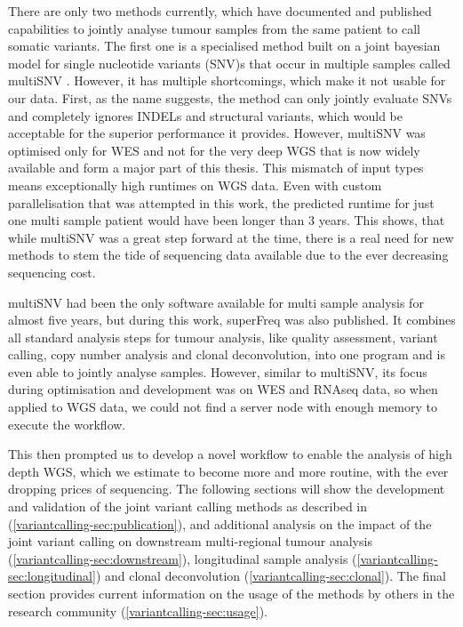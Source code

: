 There are only two methods currently, which have documented and published capabilities to jointly analyse tumour samples from the same patient to call somatic variants. The first one is a specialised method built on a joint bayesian model for single nucleotide variants (SNV)s that occur in multiple samples called multiSNV \cite{Josephidou2015}. However, it has multiple shortcomings, which make it not usable for our data. First, as the name suggests, the method can only jointly evaluate SNVs and completely ignores INDELs and structural variants, which would be acceptable for the superior performance it provides. However, multiSNV was optimised only for WES and not for the very deep WGS that is now widely available and form a major part of this thesis. This mismatch of input types means exceptionally high runtimes on WGS data. Even with custom parallelisation that was attempted in this work, the predicted runtime for just one multi sample patient would have been longer than 3 years. This shows, that while multiSNV was a great step forward at the time, there is a real need for new methods to stem the tide of sequencing data available due to the ever decreasing sequencing cost.

multiSNV had been the only software available for multi sample analysis for almost five years, but during this work, superFreq \cite{Flensburg2020} was also published. It combines all standard analysis steps for tumour analysis, like quality assessment, variant calling, copy number analysis and clonal deconvolution, into one program and is even able to jointly analyse samples. However, similar to multiSNV, its focus during optimisation and development was on WES and RNAseq data, so when applied to WGS data, we could not find a server node with enough memory to execute the workflow.

This then prompted us to develop a novel workflow to enable the analysis of high depth WGS, which we estimate to become more and more routine, with the ever dropping prices of sequencing. The following sections will show the development and validation of the joint variant calling methods as described in \textcite{Hollizeck2021} (\autoref{variantcalling-sec:publication}), and additional analysis on the impact of the joint variant calling on downstream multi-regional tumour analysis (\autoref{variantcalling-sec:downstream}), longitudinal sample analysis (\autoref{variantcalling-sec:longitudinal}) and clonal deconvolution (\autoref{variantcalling-sec:clonal}). The final section provides current information on the usage of the methods by others in the research community (\autoref{variantcalling-sec:usage}).

